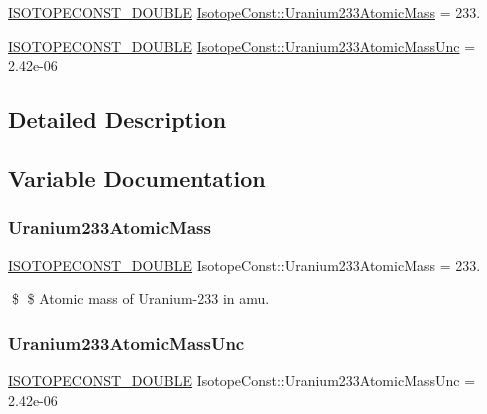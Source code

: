 \begin{DoxyCompactItemize}
\item 
\mbox{\hyperlink{group___isotope_const-_macros_ga8f45a7272ce02c0b4c65c44636ed719a}{I\+S\+O\+T\+O\+P\+E\+C\+O\+N\+S\+T\+\_\+\+D\+O\+U\+B\+LE}} \mbox{\hyperlink{group___isotope_const-_uranium-_u233_gac52c84417dcc00c8f5d0d93f0f20d567}{Isotope\+Const\+::\+Uranium233\+Atomic\+Mass}} = 233.
\item 
\mbox{\hyperlink{group___isotope_const-_macros_ga8f45a7272ce02c0b4c65c44636ed719a}{I\+S\+O\+T\+O\+P\+E\+C\+O\+N\+S\+T\+\_\+\+D\+O\+U\+B\+LE}} \mbox{\hyperlink{group___isotope_const-_uranium-_u233_gac77fc7cc58c78cbef722ed8bac78bc54}{Isotope\+Const\+::\+Uranium233\+Atomic\+Mass\+Unc}} = 2.\+42e-\/06
\end{DoxyCompactItemize}


\subsection{Detailed Description}


\subsection{Variable Documentation}
\mbox{\label{group___isotope_const-_uranium-_u233_gac52c84417dcc00c8f5d0d93f0f20d567}} 
\subsubsection{\texorpdfstring{Uranium233\+Atomic\+Mass}{Uranium233AtomicMass}}
{\footnotesize\ttfamily \mbox{\hyperlink{group___isotope_const-_macros_ga8f45a7272ce02c0b4c65c44636ed719a}{I\+S\+O\+T\+O\+P\+E\+C\+O\+N\+S\+T\+\_\+\+D\+O\+U\+B\+LE}} Isotope\+Const\+::\+Uranium233\+Atomic\+Mass = 233.}

\$ \$ Atomic mass of Uranium-\/233 in amu. \mbox{\label{group___isotope_const-_uranium-_u233_gac77fc7cc58c78cbef722ed8bac78bc54}} 
\subsubsection{\texorpdfstring{Uranium233\+Atomic\+Mass\+Unc}{Uranium233AtomicMassUnc}}
{\footnotesize\ttfamily \mbox{\hyperlink{group___isotope_const-_macros_ga8f45a7272ce02c0b4c65c44636ed719a}{I\+S\+O\+T\+O\+P\+E\+C\+O\+N\+S\+T\+\_\+\+D\+O\+U\+B\+LE}} Isotope\+Const\+::\+Uranium233\+Atomic\+Mass\+Unc = 2.\+42e-\/06}

